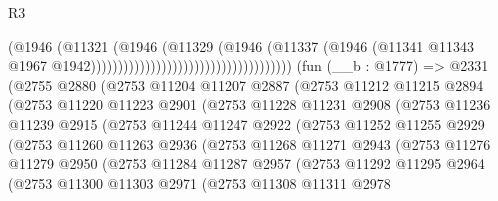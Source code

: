 \begin{lexlean}{R3}
\begin{coremodule}
                                                              (@1946
                                                                (@11321
                                                                  (@1946
                                                                    (@11329
                                                                      (@1946
                                                                        (@11337
                                                                          (@1946
                                                                            (@11341
                                                                              @11343
                                                                              @1967
                                                                              @1942)))))))))))))))))))))))))))))))))))))
    (fun (__b : @1777) =>
    @2331
      (@2755
        @2880
        (@2753
          @11204
          @11207
          @2887
          (@2753
            @11212
            @11215
            @2894
            (@2753
              @11220
              @11223
              @2901
              (@2753
                @11228
                @11231
                @2908
                (@2753
                  @11236
                  @11239
                  @2915
                  (@2753
                    @11244
                    @11247
                    @2922
                    (@2753
                      @11252
                      @11255
                      @2929
                      (@2753
                        @11260
                        @11263
                        @2936
                        (@2753
                          @11268
                          @11271
                          @2943
                          (@2753
                            @11276
                            @11279
                            @2950
                            (@2753
                              @11284
                              @11287
                              @2957
                              (@2753
                                @11292
                                @11295
                                @2964
                                (@2753
                                  @11300
                                  @11303
                                  @2971
                                  (@2753
                                    @11308
                                    @11311
                                    @2978

\end{coremodule}
\end{lexlean}
